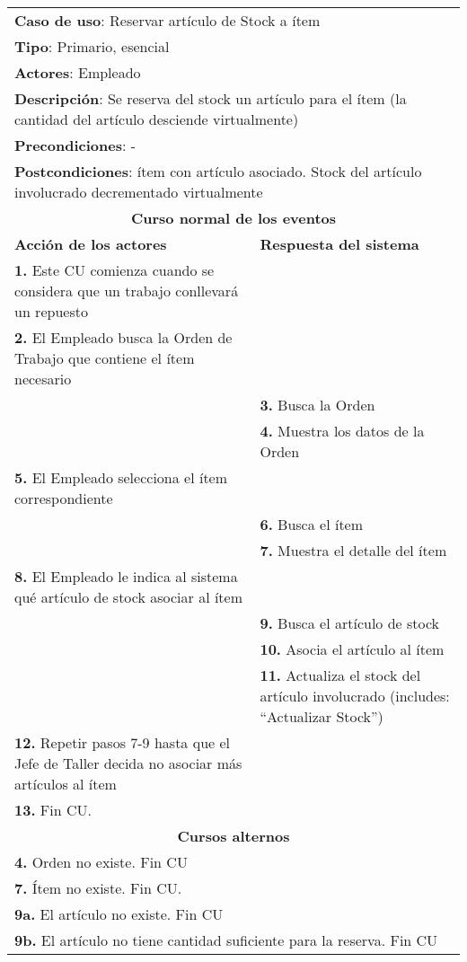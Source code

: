 	\begin{longtable}{ |p{8cm}|p{8cm}| }
		\hline
		\multicolumn{2}{|p{16cm}|}{\textbf{Caso de uso}: Reservar artículo de Stock a ítem}\\
		\multicolumn{2}{|p{16cm}|}{\textbf{Tipo}: Primario, esencial}\\
		\multicolumn{2}{|p{16cm}|}{\textbf{Actores}: Empleado}\\
		\multicolumn{2}{|p{16cm}|}{\textbf{Descripción}: Se reserva del stock un artículo para el ítem (la cantidad del artículo desciende virtualmente)}\\
		\multicolumn{2}{|p{16cm}|}{\textbf{Precondiciones}: -}\\
		\multicolumn{2}{|p{16cm}|}{\textbf{Postcondiciones}: ítem con artículo asociado. Stock del artículo involucrado decrementado virtualmente}\\
		\hline
		\multicolumn{2}{|c|}{\textbf{Curso normal de los eventos}}\\
		\hline
		\textbf{Acción de los actores} & \textbf{Respuesta del sistema}\\
		\hline
			\textbf{1. }Este CU comienza cuando se considera que un trabajo conllevará un repuesto& \\
			\hline
			\textbf{2. }El Empleado busca la Orden de Trabajo que contiene el ítem necesario & \\
			\hline
			& \textbf{3. }Busca la Orden \\
			\hline
			& \textbf{4. }Muestra los datos de la Orden \\
			\hline
			\textbf{5. }El Empleado selecciona el ítem correspondiente & \\
			\hline
			& \textbf{6. }Busca el ítem \\
			\hline
			& \textbf{7. }Muestra el detalle del ítem \\
			\hline
			\textbf{8. }El Empleado le indica al sistema qué artículo de stock asociar al ítem & \\
			\hline
			& \textbf{9. }Busca el artículo de stock\\
			\hline
			& \textbf{10. }Asocia el artículo al ítem\\
			\hline
			& \textbf{11. }Actualiza el stock del artículo involucrado (includes: ``Actualizar Stock'')\\
			\hline
			\textbf{12. }Repetir pasos 7-9 hasta que el Jefe de Taller decida no asociar más artículos al ítem&\\
			\hline
			\textbf{13. }Fin CU. & \\
		\hline
		\multicolumn{2}{|c|}{\textbf{Cursos alternos}}\\
		\hline
		\multicolumn{2}{|p{16cm}|}{\textbf{4. }Orden no existe. Fin CU}\\
		\hline
		\multicolumn{2}{|p{16cm}|}{\textbf{7. }Ítem no existe. Fin CU.}\\
		\hline
		\multicolumn{2}{|p{16cm}|}{\textbf{9a. }El artículo no existe. Fin CU}\\
		\hline
		\multicolumn{2}{|p{16cm}|}{\textbf{9b. }El artículo no tiene cantidad suficiente para la reserva. Fin CU}\\
		\hline
	\end{longtable}
